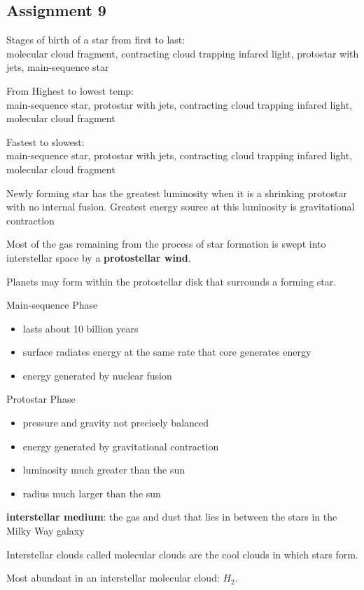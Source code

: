 \subsection{Assignment 9}
Stages of birth of a star from first to last:\\
molecular cloud fragment, contracting cloud trapping infared light, protostar with jets, main-sequence star

From Highest to lowest temp:\\
main-sequence star, protostar with jets, contracting cloud trapping infared light, molecular cloud fragment

Fastest to slowest:\\
main-sequence star, protostar with jets, contracting cloud trapping infared light, molecular cloud fragment

Newly forming star has the greatest luminosity when it is a shrinking protostar with no internal fusion. Greatest energy source at this luminosity is gravitational contraction

Most of the gas remaining from the process of star formation is swept into interstellar space by a {\bf protostellar wind}.

Planets may form within the protostellar disk that surrounds a forming star.

Main-sequence Phase
\begin{itemize}
\item lasts about 10 billion years
\item surface radiates energy at the same rate that core generates energy
\item energy generated by nuclear fusion
\end{itemize}

Protostar Phase
\begin{itemize}
\item pressure and gravity not precisely balanced
\item energy generated by gravitational contraction
\item luminosity much greater than the sun
\item radius much larger than the sun
\end{itemize}

{\bf interstellar medium}: the gas and dust that lies in between the stars in the Milky Way galaxy

Interstellar clouds called molecular clouds are the cool clouds in which stars form.

Most abundant in an interstellar molecular cloud: $H_2$.

